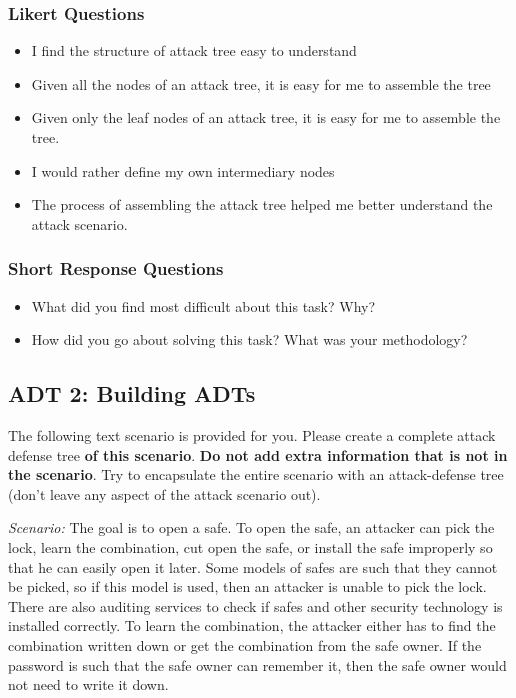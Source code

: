 \subsubsection{Likert Questions}
\begin{itemize}
  \setlength{\itemindent}{\qIndent}
  \item[\surveyq{LS-ADT1-L1}] I find the structure of attack tree easy to understand
  \item[\surveyq{LS-ADT1-L2}] Given all the nodes of an attack tree, it is easy for me to assemble the tree
  \item[\surveyq{LS-ADT1-L3}] Given only the leaf nodes of an attack tree, it is easy for me to assemble the tree.
  \item[\surveyq{LS-ADT1-L4}] I would rather define my own intermediary nodes
  \item[\surveyq{LS-ADT1-L5}] The process of assembling the attack tree helped me better understand the attack scenario.
\end{itemize}

\subsubsection{Short Response Questions}
\begin{itemize}
  \setlength{\itemindent}{\qIndent}
  \item[\surveyq{LS-ADT1-W1}] What did you find most difficult about this task? Why?
  \item[\surveyq{LS-ADT1-W2}] How did you go about solving this task? What was your methodology?
\end{itemize}



\subsection{ADT 2: Building ADTs}

The following text scenario is provided for you. Please create a complete attack defense tree \textbf{of this scenario}. \textbf{Do not add extra information that is not in the scenario}. Try to encapsulate the entire scenario with an attack-defense tree (don't leave any aspect of the attack scenario out).

\emph{Scenario:} 
The goal is to open a safe. To open the safe, an attacker can pick the lock,
learn the combination, cut open the safe, or install the safe improperly so
that he can easily open it later. Some models of safes are such that they cannot be picked, so if this model is used, then an attacker is unable to pick the lock. There are also auditing services to check if safes and other security technology is installed correctly. To learn the combination, the attacker
either has to find the combination written down or get the combination
from the safe owner. If the password is such that the safe owner can remember it, then the safe owner would not need to write it down.



